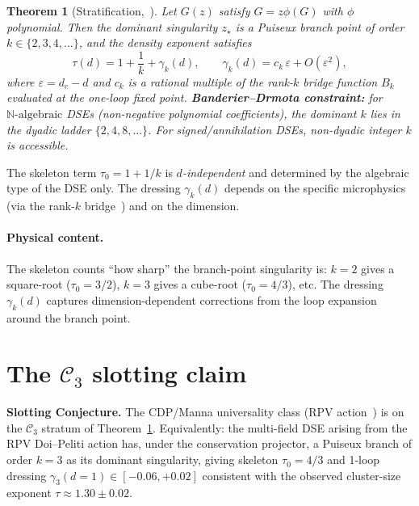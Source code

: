 \documentclass[10pt,a4paper,twocolumn]{article}
\theoremstyle{plain}
\newtheorem{theorem}{Theorem}
\theoremstyle{definition}
\newcommand{\eps}{\varepsilon}
\newcommand{\Cstr}[1]{\mathcal{C}_{#1}}
\newcommand{\Nalg}{\mathbb{N}\text{-algebraic}}
\begin{document}
\begin{theorem}[Stratification,~\citep{AmarteifioCFAC2026}]
\label{thm:strat}
Let $G(z)$ satisfy $G = z\phi(G)$ with $\phi$ polynomial.  Then the
dominant singularity $z_\star$ is a Puiseux branch point of order
$k \in \{2, 3, 4, \ldots\}$, and the density exponent satisfies
\begin{equation}\label{eq:tau_strat}
  \tau(d) = 1 + \frac{1}{k} + \gamma_k(d), \qquad
  \gamma_k(d) = c_k\,\eps + O(\eps^2),
\end{equation}
where $\eps = d_c - d$ and $c_k$ is a rational multiple of the rank-$k$
bridge function $B_k$ evaluated at the one-loop fixed point.
\textbf{Banderier--Drmota constraint:} for $\Nalg$ DSEs (non-negative
polynomial coefficients), the dominant $k$ lies in the dyadic ladder
$\{2, 4, 8, \ldots\}$.  For signed/annihilation DSEs, non-dyadic
integer $k$ is accessible.
\end{theorem}

The skeleton term $\tau_0 = 1 + 1/k$ is \emph{$d$-independent} and
determined by the algebraic type of the DSE only.  The dressing
$\gamma_k(d)$ depends on the specific microphysics (via the rank-$k$
bridge~\citep[Section 4]{AmarteifioCFAC2026}) and on the dimension.

\paragraph{Physical content.}
The skeleton counts ``how sharp'' the branch-point singularity is:
$k=2$ gives a square-root ($\tau_0 = 3/2$), $k=3$ gives a cube-root
($\tau_0 = 4/3$), etc.  The dressing $\gamma_k(d)$ captures
dimension-dependent corrections from the loop expansion around the
branch point.

\section{The $\Cstr{3}$ slotting claim}
\label{sec:slotting}

\begin{slotbox}
\textbf{Slotting Conjecture.}
The CDP/Manna universality class (RPV
action~\citep{RossiPastorSatorrasVespignani2000}) is on the
$\Cstr{3}$ stratum of Theorem~\ref{thm:strat}.  Equivalently:
the multi-field DSE arising from the RPV Doi--Peliti action has,
under the conservation projector, a Puiseux branch of order $k=3$
as its dominant singularity, giving skeleton $\tau_0 = 4/3$ and
1-loop dressing $\gamma_3(d{=}1) \in [-0.06, +0.02]$ consistent with
the observed cluster-size exponent $\tau \approx 1.30 \pm 0.02$.
\end{slotbox}
\end{document}
